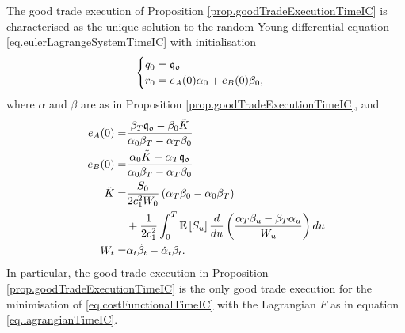 \documentclass[10pt,a4paper]{article}
\begin{document}
\begin{prop}  \label{prop.characterisationEulerLagrangeTimeIC}
The good trade execution of Proposition \ref{prop.goodTradeExecutionTimeIC} is characterised as the unique solution to the random Young differential equation \eqref{eq.eulerLagrangeSystemTimeIC} with initialisation
\begin{equation*}
\begin{cases}
q_0 = \mathfrak{q_0} \\
r_0 = e_A(0) \alpha_0 + e_B (0) \beta_0,
\end{cases}
\end{equation*}
where $\alpha$ and $\beta$ are as in Proposition \ref{prop.goodTradeExecutionTimeIC}, and 
\begin{equation*}
\begin{split}
e_A (0) =& \frac{ \beta_T \mathfrak{q_0} - \beta_0 \tilde{K}}{\alpha_0\beta_T - \alpha_T \beta_0} \\
e_B (0) =& \frac{\alpha_0 \tilde{K} - \alpha_T \mathfrak{q_0}}{\alpha_0\beta_T - \alpha_T \beta_0} \\
\tilde{K} = & \frac{S_0}{2c_{1}^{2} W_0}\left(\alpha_T \beta_0 - \alpha_0 \beta_T \right) \\
& + \frac{1}{2c_{1}^{2}} \int_{0}^{T} \mathbb{{E}}\left[S_u\right] 
\frac{d}{d u} \left(\frac{\alpha_T \beta_u - \beta_T \alpha_u}{W_u}\right) du \\
W_t = & \alpha_t \dot{\beta}_t - \dot{\alpha}_t \beta_t. 
\end{split}
\end{equation*}
In particular, the good trade execution in Proposition \ref{prop.goodTradeExecutionTimeIC} is the only good trade execution for the minimisation of \eqref{eq.costFunctionalTimeIC} with the Lagrangian $F$ as in equation \eqref{eq.lagrangianTimeIC}.
\end{prop}
\end{document}
